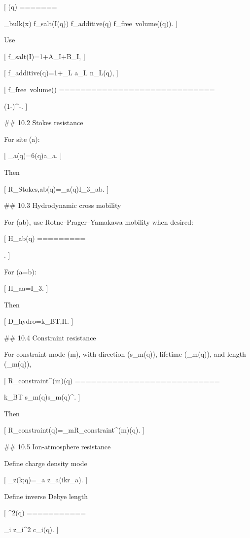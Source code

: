 [
\eta(q)
=======

\eta_{\rm bulk}(x)
f_{\rm salt}(I(q))
f_{\rm additive}(q)
f_{\rm free\ volume}(\varphi(q)).
]

Use

[
f_{\rm salt}(I)=1+A_\eta\sqrt I+B_\eta I,
]

[
f_{\rm additive}(q)=1+\sum_L a_L n_L(q),
]

[
f_{\rm free\ volume}(\varphi)
=============================

\left(1-\frac{\varphi}{\varphi_{\max}}\right)^{-\gamma}.
]

## 10.2 Stokes resistance

For site (a):

[
\zeta_a(q)=6\pi\eta(q)a_a.
]

Then

[
R_{{\rm Stokes},ab}(q)=\zeta_a(q)I_3\delta_{ab}.
]

## 10.3 Hydrodynamic cross mobility

For (a\ne b), use Rotne–Prager–Yamakawa mobility when desired:

[
H_{ab}(q)
=========

.
]

For (a=b):

[
H_{aa}=I_3.
]

Then

[
D_{\rm hydro}=k_BT,H.
]

## 10.4 Constraint resistance

For constraint mode (m), with direction (s_m(q)), lifetime (\tau_m(q)), and length (\ell_m(q)),

[
R_{\rm constraint}^{(m)}(q)
===========================

k_BT
s_m(q)s_m(q)^\top.
]

Then

[
R_{\rm constraint}(q)=\sum_mR_{\rm constraint}^{(m)}(q).
]

## 10.5 Ion-atmosphere resistance

Define charge density mode

[
\rho_z(k;q)=\sum_a z_a\exp(ik\cdot r_a).
]

Define inverse Debye length

[
\kappa^2(q)
===========

\sum_i z_i^2 c_i(q).
]

